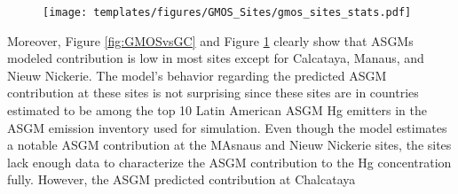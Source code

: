 \begin{figure}[H]
\texttt{[image: templates/figures/GMOS\_Sites/gmos\_sites\_stats.pdf]}
\centering
{}
\label{fig:gmos_sites_stats}
\end{figure}
\FloatBarrier
\begin{flushleft}
Moreover, Figure \ref{fig:GMOSvsGC} and Figure \ref{fig:gmos_sites_stats} clearly show that ASGMs modeled contribution is low in most sites except for Calcataya, Manaus, and Nieuw Nickerie. The model's behavior regarding the predicted ASGM contribution at these sites is not surprising since these sites are in countries estimated to be among the top 10 Latin American ASGM Hg emitters in the ASGM emission inventory used for \gc simulation. Even though the model estimates a notable ASGM contribution at the MAsnaus and Nieuw Nickerie sites, the sites lack enough data to characterize the ASGM contribution to the Hg concentration fully. However, the ASGM predicted contribution at Chalcataya 
\end{flushleft}

\begin{table}[H]
\label{tab:model_percentage_overestimation_of_mean}

\center
{}

\end{table}


